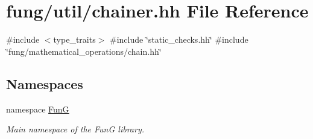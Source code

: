 \hypertarget{chainer_8hh}{\section{fung/util/chainer.hh \-File \-Reference}
\label{chainer_8hh}
}
{\ttfamily \#include $<$type\-\_\-traits$>$}\*
{\ttfamily \#include \char`\"{}static\-\_\-checks.\-hh\char`\"{}}\*
{\ttfamily \#include \char`\"{}fung/mathematical\-\_\-operations/chain.\-hh\char`\"{}}\*
\subsection*{\-Namespaces}
\begin{DoxyCompactItemize}
\item 
namespace \hyperlink{namespaceFunG}{\-Fun\-G}
\begin{DoxyCompactList}\small\item\em \-Main namespace of the \-Fun\-G library. \end{DoxyCompactList}\end{DoxyCompactItemize}
